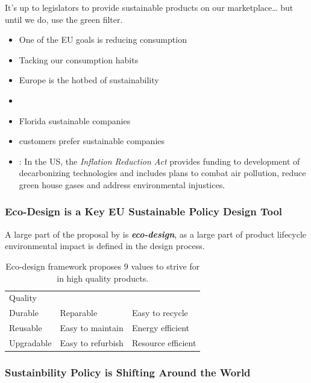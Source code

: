 \documentclass[
  letterpaper,
  DIV=11,
  numbers=noendperiod]{scrartcl}
\providecommand{\tightlist}{%
  \setlength{\itemsep}{0pt}\setlength{\parskip}{0pt}}\usepackage{longtable,booktabs,array}
\begin{document}
It's up to legislators to provide sustainable products on our
marketplace\ldots{} but until we do, use the green filter.

\begin{itemize}
\tightlist
\item
  One of the EU goals is reducing consumption
\item
  Tacking our consumption habits
\item
  Europe is the hotbed of sustainability
\item
  \citet{imanghoshMappedWhereAre2020}
\item
  \citet{lamoureuxNotableSustainableCompanies2018} Florida sustainable
  companies
\item
  \citet{michaelhoulihanItOfficialCustomers2018} customers prefer
  sustainable companies
\item
  \citet{rajagopalanInflationReductionAct2023}: In the US, the
  \emph{Inflation Reduction Act} provides funding to development of
  decarbonizing technologies and includes plans to combat air pollution,
  reduce green house gases and address environmental injustices.
\end{itemize}

\subsubsection{Eco-Design is a Key EU Sustainable Policy Design
Tool}\label{eco-design-is-a-key-eu-sustainable-policy-design-tool}

A large part of the proposal by
\citet{commissionEcodesignYourFuture2014} is \textbf{\emph{eco-design}},
as a large part of product lifecycle environmental impact is defined in
the design process.

\begin{longtable}[]{@{}lll@{}}
\caption{Eco-design framework proposes 9 values to strive for in high
quality products.}\tabularnewline
\toprule\noalign{}
\endfirsthead
\endhead
\bottomrule\noalign{}
\endlastfoot
Quality & & \\
Durable & Reparable & Easy to recycle \\
Reusable & Easy to maintain & Energy efficient \\
Upgradable & Easy to refurbish & Resource efficient \\
\end{longtable}

\subsubsection{Sustainbility Policy is Shifting Around the
World}\label{sustainbility-policy-is-shifting-around-the-world}
\end{document}
